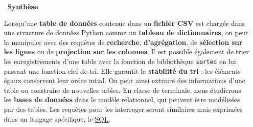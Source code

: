 \documentclass[
  11pt,
]{article}
\newcommand{\passthrough}[1]{#1}
\newenvironment{synthese}
{\par \medskip   \noindent   
\begin{bclogo}[arrondi =0.1,   noborder = true, logo=\bccle, marge=4]{~\textbf{Synthèse}   }  \par}
{
\end{bclogo}
 \par \bigskip }
\begin{document}
\begin{synthese}{}

Lorsqu'une \textbf{table de données} contenue dans un \textbf{fichier
CSV} est chargée dans une structure de données Python comme un
\textbf{tableau de dictionnaires}, on peut la manipuler avec des
requêtes de \textbf{recherche}, \textbf{d'agrégation}, de
\textbf{sélection sur les lignes} ou de \textbf{projection sur les
colonnes}. Il est possible également de trier les enregistrements d'une
table avec la fonction de bibliothèque \passthrough{\lstinline!sorted!}
en lui passant une fonction clef de tri. Elle garantit la
\textbf{stabilité du tri} : les éléments égaux conservent leur ordre
intial. On peut ainsi extraire des informations d'une table ou
construire de nouvelles tables. En classe de terminale, nous étudierons
les \textbf{bases de données} dans le modèle relationnel, qui peuvent
être modélisées par des tables. Les requêtes pour les interroger seront
similaires mais exprimées dans un langage spécifique, le
\href{https://pixees.fr/informatiquelycee/n_site/nsi_term_bd_sql.html}{SQL}.

\end{synthese}
\end{document}
